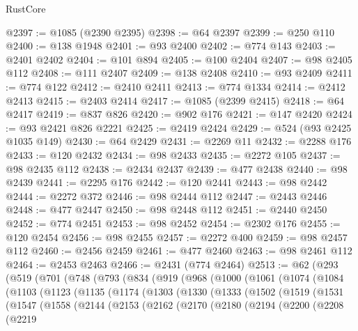 \begin{lexlean}{RustCore}
\begin{coremodule}
@2397 := @1085 (@2390 @2395)
@2398 := @64 @2397
@2399 := @250 @110
@2400 := @138 @1948
@2401 := @93 @2400
@2402 := @774 @143
@2403 := @2401 @2402
@2404 := @101 @894
@2405 := @100 @2404
@2407 := @98 @2405 @112
@2408 := @111 @2407
@2409 := @138 @2408
@2410 := @93 @2409
@2411 := @774 @122
@2412 := @2410 @2411
@2413 := @774 @1334
@2414 := @2412 @2413
@2415 := @2403 @2414
@2417 := @1085 (@2399 @2415)
@2418 := @64 @2417
@2419 := @837 @826
@2420 := @902 @176
@2421 := @147 @2420
@2424 := @93 @2421 @826 @2221
@2425 := @2419 @2424
@2429 := @524 (@93 @2425 @1035 @149)
@2430 := @64 @2429
@2431 := @2269 @11
@2432 := @2288 @176
@2433 := @120 @2432
@2434 := @98 @2433
@2435 := @2272 @105
@2437 := @98 @2435 @112
@2438 := @2434 @2437
@2439 := @477 @2438
@2440 := @98 @2439
@2441 := @2295 @176
@2442 := @120 @2441
@2443 := @98 @2442
@2444 := @2272 @372
@2446 := @98 @2444 @112
@2447 := @2443 @2446
@2448 := @477 @2447
@2450 := @98 @2448 @112
@2451 := @2440 @2450
@2452 := @774 @2451
@2453 := @98 @2452
@2454 := @2302 @176
@2455 := @120 @2454
@2456 := @98 @2455
@2457 := @2272 @400
@2459 := @98 @2457 @112
@2460 := @2456 @2459
@2461 := @477 @2460
@2463 := @98 @2461 @112
@2464 := @2453 @2463
@2466 := @2431 (@774 @2464)
@2513 := @62
    (@293
      (@519
        (@701
          (@748
            (@793
              (@834
                (@919
                  (@968
                    (@1000
                      (@1061
                        (@1074
                          (@1084
                            (@1103
                              (@1123
                                (@1135
                                  (@1174
                                    (@1303
                                      (@1330
                                        (@1333
                                          (@1502
                                            (@1519
                                              (@1531
                                                (@1547
                                                  (@1558
                                                    (@2144
                                                      (@2153
                                                        (@2162
                                                          (@2170
                                                            (@2180
                                                              (@2194
                                                                (@2200
                                                                  (@2208
                                                                    (@2219

\end{coremodule}
\end{lexlean}
